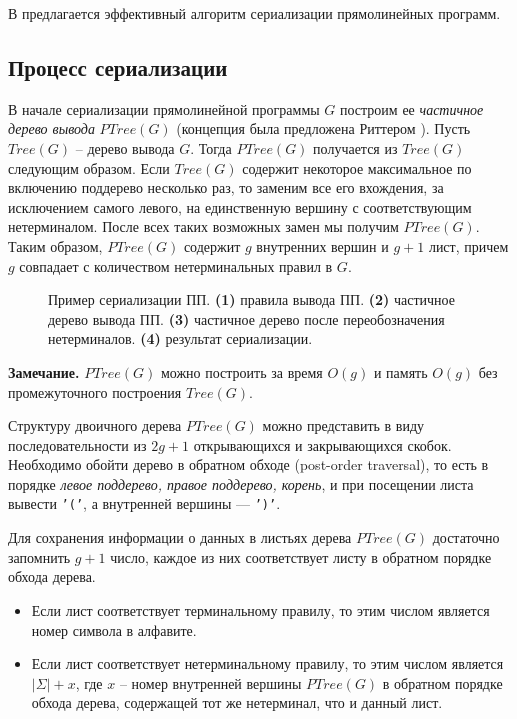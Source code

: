 \documentclass[14pt]{article}
\begin{document}
В \cite{LCAOnlineSLP} предлагается эффективный алгоритм сериализации прямолинейных программ.

\subsection{Процесс сериализации}

В начале сериализации прямолинейной программы $G$ построим ее {\it частичное дерево вывода} $PTree(G)$
(концепция была предложена Риттером \cite{RytterSLPConstruction}). Пусть $Tree(G)$ -- дерево вывода $G$.
Тогда $PTree(G)$ получается из $Tree(G)$ следующим образом. Если $Tree(G)$ содержит
некоторое максимальное по включению поддерево несколько раз, то заменим все его вхождения,
за исключением самого левого, на единственную вершину с соответствующим нетерминалом. После всех таких возможных 
замен мы получим $PTree(G)$. Таким образом, $PTree(G)$ содержит $g$ внутренних вершин и $g+1$ лист,
причем $g$ совпадает с количеством нетерминальных правил в $G$.

\begin{figure}[b!]
	\begin{center}
		\resizebox{10cm}{4cm}{
			\picSlpEncoding{}
		}
	\end{center}
	\caption{Пример сериализации ПП. {\bf (1)} правила вывода ПП. {\bf (2)} частичное дерево вывода ПП.
			{\bf (3)} частичное дерево после переобозначения нетерминалов. {\bf (4)} результат сериализации.}
	\label{SlpEncodingExample}
\end{figure}

{\bf Замечание.} $PTree(G)$ можно построить за время $O(g)$ и память $O(g)$ без промежуточного построения $Tree(G)$.

Структуру двоичного дерева $PTree(G)$ можно представить в виду последовательности из $2g+1$ открывающихся и закрывающихся скобок.
Необходимо обойти дерево в обратном обходе (post-order traversal), то есть в порядке {\it левое поддерево, правое поддерево, корень},
и при посещении листа вывести \texttt{'('}, а внутренней вершины --- \texttt{')'}.

Для сохранения информации о данных в листьях дерева $PTree(G)$ достаточно запомнить $g+1$ число, каждое из них соответствует листу в 
обратном порядке обхода дерева.
\begin{itemize}
	\item Если лист соответствует терминальному правилу, то этим числом является номер символа в алфавите.
	\item Если лист соответствует нетерминальному правилу, то этим числом является $|\Sigma| + x$, где $x$ --
	номер внутренней вершины $PTree(G)$ в обратном порядке обхода дерева, содержащей тот же нетерминал, что и данный лист.
\end{itemize}
\end{document}
